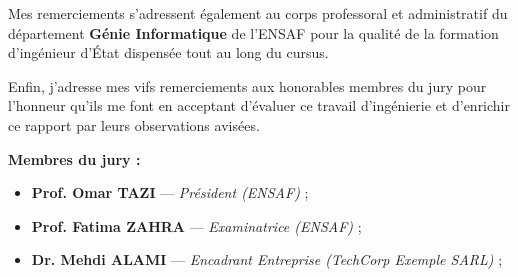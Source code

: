 \vspace{0.4cm}

\noindent
Mes remerciements s'adressent \'egalement au corps professoral et administratif du d\'epartement \textbf{Génie Informatique} de l'ENSAF pour la qualit\'e de la formation d'ing\'enieur d'\'Etat dispens\'ee tout au long du cursus.

\vspace{0.4cm}

\noindent
Enfin, j'adresse mes vifs remerciements aux honorables membres du jury pour l'honneur qu'ils me font en acceptant d'\'evaluer ce travail d'ing\'enierie et d'enrichir ce rapport par leurs observations avis\'ees.

\vspace{0.4cm}
\noindent
\textbf{Membres du jury :}
\begin{itemize}
    \item \textbf{Prof. Omar TAZI} --- \textit{Président (ENSAF)} ;
    \item \textbf{Prof. Fatima ZAHRA} --- \textit{Examinatrice (ENSAF)} ;
    \item \textbf{Dr. Mehdi ALAMI} --- \textit{Encadrant Entreprise (TechCorp Exemple SARL)} ;
\end{itemize}

